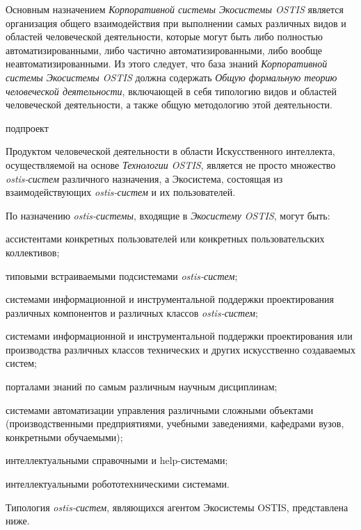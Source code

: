 
Основным назначением \textit{Корпоративной системы Экосистемы OSTIS} является организация общего взаимодействия при выполнении самых различных видов и областей человеческой деятельности, которые могут быть либо полностью автоматизированными, либо частично автоматизированными, либо вообще неавтоматизированными. 
Из этого следует, что база знаний \textit{Корпоративной системы Экосистемы OSTIS} должна содержать \textit{Общую формальную теорию человеческой деятельности}, включающей в себя типологию видов и областей человеческой деятельности, а также общую методологию этой деятельности.

\begin{SCn}
\begin{scnrelfromlist}{подпроект}
\end{scnrelfromlist}
\end{SCn}

Продуктом человеческой деятельности в области Искусственного интеллекта, осуществляемой на основе \textit{Технологии OSTIS}, является не просто множество \textit{ostis-систем} различного назначения, а Экосистема, состоящая из взаимодействующих \textit{ostis-систем} и их пользователей. 

По назначению \textit{ostis-системы}, входящие в \textit{Экосистему OSTIS}, могут быть:
\begin{textitemize}
    \item ассистентами конкретных пользователей или конкретных пользовательских коллективов;
    \item типовыми встраиваемыми подсистемами \textit{ostis-систем};
    \item системами информационной и инструментальной поддержки проектирования различных компонентов и различных классов \textit{ostis-систем};
    \item системами информационной и инструментальной поддержки проектирования или производства различных классов технических и других искусственно создаваемых систем;
    \item порталами знаний по самым различным научным дисциплинам;
    \item системами автоматизации управления различными сложными объектами (производственными предприятиями, учебными заведениями, кафедрами вузов, конкретными обучаемыми);
    \item интеллектуальными справочными и help-системами;
    \item интеллектуальными робототехническими системами.
\end{textitemize}
Типология \textit{ostis-систем}, являющихся агентом Экосистемы OSTIS, представлена ниже.


